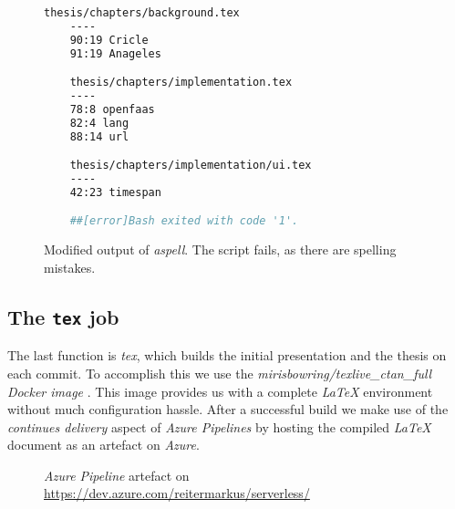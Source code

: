 \begin{figure}[H]
  \begin{lstlisting}[language=bash, basicstyle=\footnotesize\ttfamily]
    thesis/chapters/background.tex
    ----
    90:19 Cricle
    91:19 Anageles

    thesis/chapters/implementation.tex
    ----
    78:8 openfaas
    82:4 lang
    88:14 url

    thesis/chapters/implementation/ui.tex
    ----
    42:23 timespan

    ##[error]Bash exited with code '1'.
  \end{lstlisting}
  \caption{Modified output of \textit{aspell}. The script fails, as there are spelling mistakes.}
\end{figure}

\subsection{The \texttt{tex} job}

The last function is \textit{tex}, which builds the initial presentation and the thesis on each
commit. To accomplish this we use the \textit{mirisbowring/texlive\_ctan\_full Docker image}
\cite{tex-hub}. This image provides us with a complete \textit{LaTeX} environment without much
configuration hassle. After a successful build we make use of the \textit{continues delivery} aspect
of \textit{Azure Pipelines} by hosting the compiled \textit{LaTeX} document as an artefact on
\textit{Azure}.

\begin{figure}[H]
  \centering
  \caption{\textit{Azure Pipeline} artefact on \url{https://dev.azure.com/reitermarkus/serverless/}}
\end{figure}
